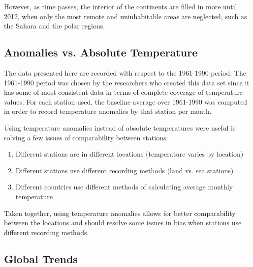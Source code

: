 \documentclass{article}\usepackage{graphicx, color}
\begin{document}
However, as time passes, the interior of the continents are filled in more until 2012, when only the most remote and uninhabitable areas are neglected, such as the Sahara and the polar regions.

\subsection*{Anomalies vs. Absolute Temperature}
The data presented here are recorded with respect to the 1961-1990 period.  The 1961-1990 period was chosen by the researchers who created this data set since it has some of most consistent data in terms of complete coverage of temperature values. For each station used, the baseline average over 1961-1990 was computed in order to record temperature anomalies by that station per month.

Using temperature anomalies instead of absolute temperatures were useful is solving a few issues of comparability between stations:
\begin{enumerate}
\item Different stations are in different locations (temperature varies by location)
\item Different stations use different recording methods (land vs. sea stations)
\item Different countries use different methods of calculating average monthly temperature
\end{enumerate}
Taken together, using temperature anomalies allows for better comparability between the locations and should resolve some issues in bias when stations use different recording methods.

\subsection*{Global Trends}
\end{document}
